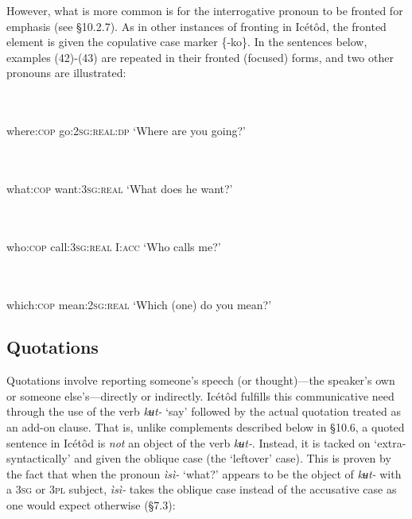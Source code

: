 However, what is more common is for the interrogative pronoun to be fronted for emphasis (see §10.2.7). As in other instances of fronting in Icétôd, the fronted element is given the copulative case marker \{-ko\}. In the sentences below, examples (42)-(43) are repeated in their fronted (focused) forms, and two other pronouns are illustrated:



\ea\label{ex:}
 \\
    \\
where:\textsc{cop}   go:\textsc{2sg:real:dp}
\glt ‘Where are you going?’ 
\z




\ea\label{ex:}
 \\
    \\
what:\textsc{cop}   want:\textsc{3sg:real}
\glt ‘What does he want?’ 
\z




\ea\label{ex:}
 \\
    \\
who:\textsc{cop}   call:\textsc{3sg:real}   I:\textsc{acc}
\glt ‘Who calls me?’ 
\z




\ea\label{ex:}
 \\
    \\
which:\textsc{cop}   mean:\textsc{2sg:real}
\glt ‘Which (one) do you mean?’ 
\z






\subsection{Quotations}


Quotations involve reporting someone’s speech (or thought)—the speaker’s own or someone else’s—directly or indirectly. Icétôd fulfills this communicative need through the use of the verb \textit{kʉt-} ‘say’ followed by the actual quotation treated as an add-on clause. That is, unlike complements described below in §10.6, a quoted sentence in Icétôd is \textit{not} an object of the verb \textit{kʉt-}. Instead, it is tacked on ‘extra-syntactically’ and given the oblique case (the ‘leftover’ case). This is proven by the fact that when the pronoun \textit{ìsì-} ‘what?’ appears to be the object of \textit{kʉt-} with a \textsc{3sg} or \textsc{3pl} subject, \textit{ìsì-} takes the oblique case instead of the accusative case as one would expect otherwise (§7.3):




